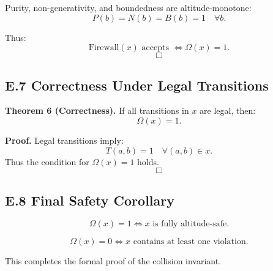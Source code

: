 Purity, non-generativity, and boundedness are altitude-monotone:
\[
P(b)=N(b)=B(b)=1 \quad \forall b.
\]

Thus:
\[
\mathrm{Firewall}(x) \text{ accepts } \iff \Omega(x)=1.
\]
\[
\Box
\]

\subsection*{E.7 Correctness Under Legal Transitions}

\textbf{Theorem 6 (Correctness).}  
If all transitions in $x$ are legal, then:
\[
\Omega(x)=1.
\]

\textbf{Proof.}  
Legal transitions imply:
\[
T(a,b)=1 \quad \forall (a,b) \in x.
\]
Thus the condition for $\Omega(x)=1$ holds.  
\[
\Box
\]

\subsection*{E.8 Final Safety Corollary}

\[
\Omega(x)=1 \iff x \text{ is fully altitude-safe}.
\]

\[
\Omega(x)=0 \iff x \text{ contains at least one violation}.
\]

This completes the formal proof of the collision invariant.
